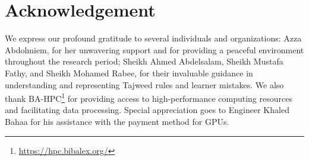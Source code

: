 \section*{Acknowledgement}
We express our profound gratitude to several individuals and organizations: Azza Abdolmiem, for her unwavering support and for providing a peaceful environment throughout the research period; Sheikh Ahmed Abdelsalam, Sheikh Mustafa Fathy, and Sheikh Mohamed Rabee, for their invaluable guidance in understanding and representing Tajweed rules and learner mistakes. We also thank BA-HPC\footnote{\url{https://hpc.bibalex.org/}} for providing access to high-performance computing resources and facilitating data processing. Special appreciation goes to Engineer Khaled Bahaa for his assistance with the payment method for GPUs.
